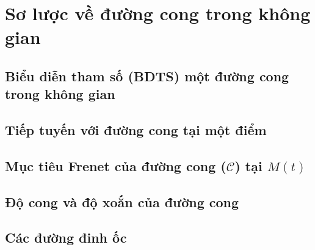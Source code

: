 \chapter{Sơ lược về đường cong trong không gian}
\section{Biểu diễn tham số (BDTS) một đường cong trong không gian}
\section{Tiếp tuyến với đường cong tại một điểm}
\section{Mục tiêu Frenet của đường cong ($\mathcal C$) tại $M(t)$}
\section{Độ cong và độ xoắn của đường cong}
\section{Các đường đinh ốc}